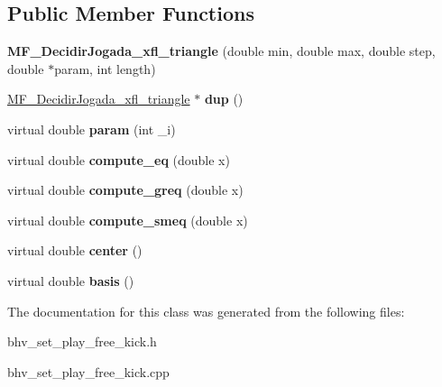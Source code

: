 \subsection*{Public Member Functions}
\begin{DoxyCompactItemize}
\item 
\hypertarget{classMF__DecidirJogada__xfl__triangle_a9dd373e4a04dd9b3945c21c57cf0c41c}{
{\bfseries MF\_\-DecidirJogada\_\-xfl\_\-triangle} (double min, double max, double step, double $\ast$param, int length)}
\label{classMF__DecidirJogada__xfl__triangle_a9dd373e4a04dd9b3945c21c57cf0c41c}

\item 
\hypertarget{classMF__DecidirJogada__xfl__triangle_ace2570514baf2e497b840c23247f1b27}{
\hyperlink{classMF__DecidirJogada__xfl__triangle}{MF\_\-DecidirJogada\_\-xfl\_\-triangle} $\ast$ {\bfseries dup} ()}
\label{classMF__DecidirJogada__xfl__triangle_ace2570514baf2e497b840c23247f1b27}

\item 
\hypertarget{classMF__DecidirJogada__xfl__triangle_ac0a6167b51a8c73269fbbda8f933bd20}{
virtual double {\bfseries param} (int \_\-i)}
\label{classMF__DecidirJogada__xfl__triangle_ac0a6167b51a8c73269fbbda8f933bd20}

\item 
\hypertarget{classMF__DecidirJogada__xfl__triangle_a75f3676afad46a29fefac772a61dedde}{
virtual double {\bfseries compute\_\-eq} (double x)}
\label{classMF__DecidirJogada__xfl__triangle_a75f3676afad46a29fefac772a61dedde}

\item 
\hypertarget{classMF__DecidirJogada__xfl__triangle_a8b333a4b0f3b797b9109c8edb3b83dd4}{
virtual double {\bfseries compute\_\-greq} (double x)}
\label{classMF__DecidirJogada__xfl__triangle_a8b333a4b0f3b797b9109c8edb3b83dd4}

\item 
\hypertarget{classMF__DecidirJogada__xfl__triangle_a240c490bd7d826db367616fcd4a1f871}{
virtual double {\bfseries compute\_\-smeq} (double x)}
\label{classMF__DecidirJogada__xfl__triangle_a240c490bd7d826db367616fcd4a1f871}

\item 
\hypertarget{classMF__DecidirJogada__xfl__triangle_ae463b28571c3ab6b97861c7633662bf8}{
virtual double {\bfseries center} ()}
\label{classMF__DecidirJogada__xfl__triangle_ae463b28571c3ab6b97861c7633662bf8}

\item 
\hypertarget{classMF__DecidirJogada__xfl__triangle_a7f9dfdeb512832e002239ac27232fbab}{
virtual double {\bfseries basis} ()}
\label{classMF__DecidirJogada__xfl__triangle_a7f9dfdeb512832e002239ac27232fbab}

\end{DoxyCompactItemize}


The documentation for this class was generated from the following files:\begin{DoxyCompactItemize}
\item 
bhv\_\-set\_\-play\_\-free\_\-kick.h\item 
bhv\_\-set\_\-play\_\-free\_\-kick.cpp\end{DoxyCompactItemize}
